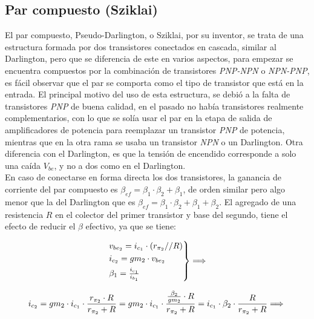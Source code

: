 
\subsection{Par compuesto (Sziklai)}

El par compuesto, Pseudo-Darlington, o Sziklai, por su inventor, se trata de una estructura formada por dos transistores conectados en cascada, similar al Darlington, pero que se diferencia de este en varios aspectos, para empezar se encuentra compuestos por la combinación de transistores \textit{PNP-NPN} o \textit{NPN-PNP}, es fácil observar que el par se comporta como el tipo de transistor que está en la entrada. El principal motivo del uso de esta estructura, se debió a la falta de transistores \textit{PNP} de buena calidad, en el pasado no había transistores realmente complementarios, con lo que se solía usar el par en la etapa de salida de amplificadores de potencia para reemplazar un transistor \textit{PNP} de potencia, mientras que en la otra rama se usaba un transistor \textit{NPN} o un Darlington. Otra diferencia con el Darlington, es que la tensión de encendido corresponde a solo una caída $V_{be}$, y no a dos como en el Darlington.\\
En caso de conectarse en forma directa los dos transistores, la ganancia de corriente del par compuesto es $\beta_{ef} = \beta_{1} \cdot \beta_{2} + \beta_{1}$, de orden similar pero algo menor que la del Darlington que es $\beta_{ef} = \beta_{1} \cdot \beta_{2} + \beta_{1} + \beta_{2}$. El agregado de una resistencia $R$ en el colector del primer transistor y base del segundo, tiene el efecto de reducir el $\beta$ efectivo, ya que se tiene:


\begin{equation}
\begin{rcases*}v_{be_{2}} = i_{c_{1}} \cdot (r_{\pi_{2}} // R) \\ i_{c_{2}} = gm_{2} \cdot v_{be_{2}} \\ \beta_{1} = \frac{i_{c_{1}}}{i_{b_{1}}}\end{rcases*} \Longrightarrow 
\end{equation}
 

\begin{equation}
i_{c_{2}} = gm_{2} \cdot i_{c_{1}} \cdot \frac{r_{\pi_{2}} \cdot R}{r_{\pi_{2} }+ R} = gm_{2} \cdot i_{c_{1}} \cdot \frac{ \frac{\beta_{2}}{gm_{2}} \cdot R}{r_{\pi_{2} }+ R} =
i_{c_{1}} \cdot \beta_{2} \cdot \frac{R}{r_{\pi_{2} }+ R} \Longrightarrow \\
\end{equation}
 

